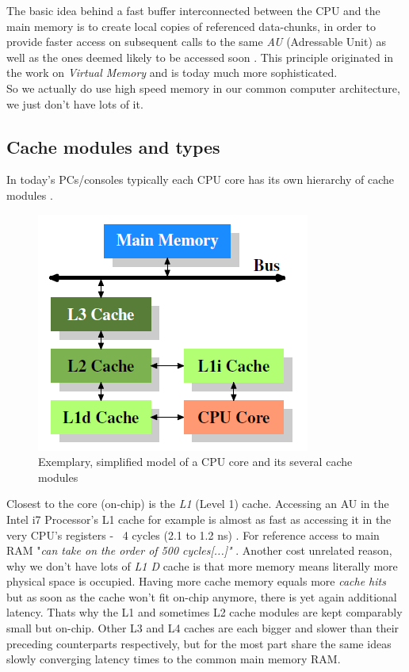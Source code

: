 The basic idea behind a fast buffer interconnected between the CPU and the main memory is to create local copies of referenced data-chunks, in order to provide faster access on subsequent calls to the same \textit{AU} (Adressable Unit) as well as the ones deemed likely to be accessed soon . This principle originated in the work on \textit{Virtual Memory}  and is today much more sophisticated.\\
So we actually do use high speed memory in our common computer architecture, we just don't have lots of it.

\subsection{Cache modules and types}
In today's PCs/consoles typically each CPU core has its own hierarchy of cache modules .
\begin{figure}[!htbp]
	\centering
	\includegraphics[width=0.4\linewidth]{PICs/cachelayout}
	\caption{Exemplary, simplified model of a CPU core and its several cache modules }\label{cache_layout}
\end{figure}
Closest to the core (on-chip) is the \textit{L1} (Level 1) cache. Accessing an AU in the  Intel i7 Processor's L1 cache for example is almost as fast as accessing it in the very CPU's registers - ~4 cycles (2.1 to 1.2 ns) . For reference access to main RAM "\textit{can take on the order of 500 cycles[...]"} .
Another cost unrelated reason, why we don't have lots of \textit{L1 D} cache is that more memory means literally more physical space is occupied. Having more cache memory equals more \textit{cache hits}  but as soon as the cache won't fit on-chip anymore, there is yet again additional latency. Thats why the L1 and sometimes L2 cache modules are kept comparably small but on-chip. Other L3 and L4 caches are each bigger and slower than their preceding counterparts respectively, but for the most part share the same ideas slowly converging latency times to the common main memory RAM.\\
